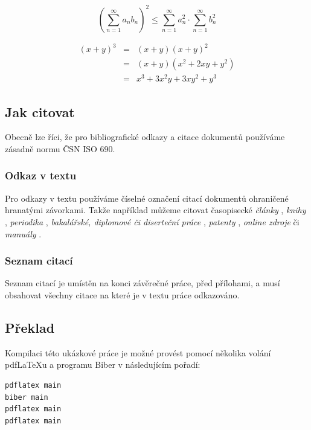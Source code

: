 \documentclass[czech,master,dept460,male,cpp,cpdeclaration]{diploma}
\begin{document}
\begin{equation}
  \left(\sum_{n=1}^{\infty}a_{n}b_{n}\right)^{2} \leq
  \sum_{n=1}^{\infty}a_{n}^{2} \cdot \sum_{n=1}^{\infty}b_{n}^{2}
  \label{eq:A}
\end{equation}

\begin{eqnarray}
  (x+y)^{3} & = & (x+y)(x+y)^{2}\label{eq:B}\\
  & = & (x+y)(x^{2}+2xy+y^{2})\nonumber\\
  & = & x^{3}+3x^{2}y+3xy^{2}+y^{3}\label{eq:C}
\end{eqnarray}
\subsection{Jak citovat}
Obecně lze říci, že pro bibliografické odkazy a citace dokumentů používáme zásadně normu ČSN ISO 690.
\subsubsection{Odkaz v textu}
Pro odkazy v textu používáme číselné označení citací dokumentů ohraničené hranatými závorkami. Takže například můžeme citovat časopisecké \emph{články} \cite{herrmann, bertram, moore, yoon, sigfridsson, baez/article}, \emph{knihy} \cite{wilde, nietzsche:ksa1, averroes/bland, hammond, cotton, knuth:ct:a, gerhardt, gonzalez, companion}, \emph{periodika} \cite{jcg}, \emph{bakalářské, diplomové či diserteční práce} \cite{geer}, \emph{patenty} \cite{kowalik, almendro, sorace, laufenberg}, \emph{online zdroje} \cite{ctan, wassenberg, itzhaki, markey, baez/online} či \emph{manuály} \cite{cms}.

\subsubsection{Seznam citací}
Seznam citací je umístěn na konci závěrečné práce, před přílohami, a musí obsahovat všechny citace na které je v textu práce odkazováno.

\subsection{Překlad}
Kompilaci této ukázkové práce je možné provést pomocí několika volání pdf\LaTeX{}u a programu Biber v následujícím pořadí:
\begin{verbatim}
pdflatex main
biber main
pdflatex main
pdflatex main
\end{verbatim}


\printbibliography[title={Literatura}, heading=bibintoc]


\appendix
\end{document}

